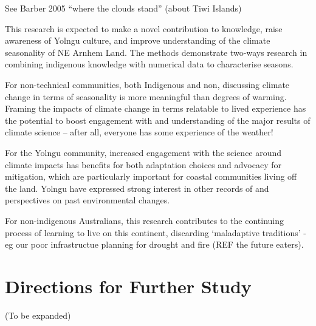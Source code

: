 See Barber 2005 ``where the clouds stand'' (about Tiwi Islands)

This research is expected to make a novel contribution to knowledge, raise
awareness of Yolngu culture, and improve understanding of the climate
seasonality of NE Arnhem Land.  The methods demonstrate two-ways research in
combining indigenous knowledge with numerical data to characterise seasons.

For non-technical communities, both Indigenous and non, discussing climate
change in terms of seasonality is more meaningful than degrees of warming.
Framing the impacts of climate change in terms relatable to lived experience
has the potential to boost engagement with and understanding of the major
results of climate science – after all, everyone has some experience of the
weather!

For the Yolngu community, increased engagement with the science around climate
impacts has benefits for both adaptation choices and advocacy for mitigation,
which are particularly important for coastal communities living off the land.
Yolngu have expressed strong interest in other records of and perspectives on
past environmental changes.

For non-indigenous Australians, this research contributes to the continuing
process of learning to live on this continent, discarding `maladaptive traditions'
- eg our poor infrastructue planning for drought and fire (REF the future eaters).



\section{Directions for Further Study}
(To be expanded)

